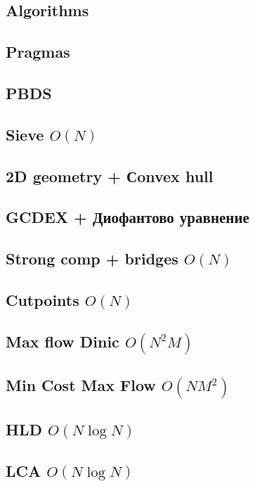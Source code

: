 \documentclass[10pt]{article}
\begin{document}
\begin{multicols}{2}
\section{Algorithms}
\subsection{Pragmas}

\subsection{PBDS}

\subsection{Sieve $O(N)$}

\subsection{2D geometry + Сonvex hull}

\subsection{GCDEX + Диофантово уравнение}

\subsection{Strong comp + bridges $O(N)$}

\subsection{Cutpoints $O(N)$}

\subsection{Max flow Dinic $O(N^2M)$}

\subsection{Min Cost Max Flow $O(NM^2)$}

\subsection{HLD $O(N\log{N})$}

\subsection{LCA $O(N\log{N})$}


\end{multicols}
\end{document}
